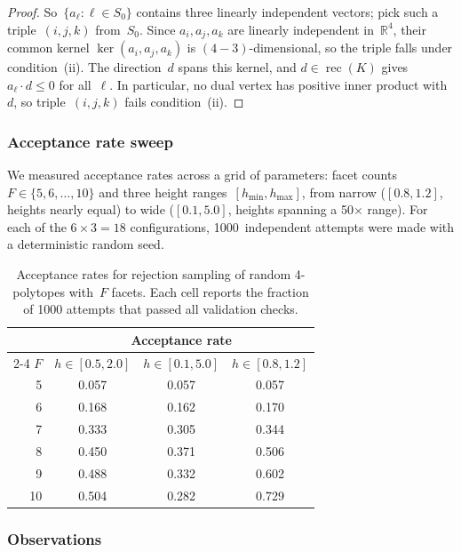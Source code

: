 \begin{unverified}
\begin{proof}
So~$\{a_\ell : \ell \in S_0\}$ contains three linearly independent vectors;
pick such a triple~$(i,j,k)$ from~$S_0$.  Since $a_i, a_j, a_k$ are linearly
independent in~$\mathbb{R}^4$, their common kernel $\ker(a_i, a_j, a_k)$ is
$(4 - 3)$-dimensional, so the triple falls under condition~\textup{(ii)}.
The direction~$d$ spans this kernel, and $d \in \operatorname{rec}(K)$ gives
$a_\ell \cdot d \le 0$ for all~$\ell$.  In particular, no dual vertex has positive
inner product with~$d$, so triple~$(i,j,k)$ fails condition~\textup{(ii)}.
\end{proof}
\end{unverified}

\subsubsection*{Acceptance rate sweep}

We measured acceptance rates across a grid of parameters: facet
counts~$F \in \{5, 6, \ldots, 10\}$ and three height
ranges~$[h_{\min}, h_{\max}]$, from narrow ($[0.8, 1.2]$, heights nearly
equal) to wide ($[0.1, 5.0]$, heights spanning a 50$\times$ range). For each
of the $6 \times 3 = 18$ configurations, 1000~independent attempts were made
with a deterministic random seed.

\begin{table}[ht]
\centering
\begin{tabular}{r ccc}
\toprule
& \multicolumn{3}{c}{Acceptance rate} \\
\cmidrule(lr){2-4}
$F$ & $h \in [0.5, 2.0]$ & $h \in [0.1, 5.0]$ & $h \in [0.8, 1.2]$ \\
\midrule
 5 & 0.057 & 0.057 & 0.057 \\
 6 & 0.168 & 0.162 & 0.170 \\
 7 & 0.333 & 0.305 & 0.344 \\
 8 & 0.450 & 0.371 & 0.506 \\
 9 & 0.488 & 0.332 & 0.602 \\
10 & 0.504 & 0.282 & 0.729 \\
\bottomrule
\end{tabular}
\caption{Acceptance rates for rejection sampling of random 4-polytopes
  with~$F$ facets. Each cell reports the fraction of 1000 attempts that passed
  all validation checks.}
\label{tab:acceptance-rates}
\end{table}

\subsubsection*{Observations}

